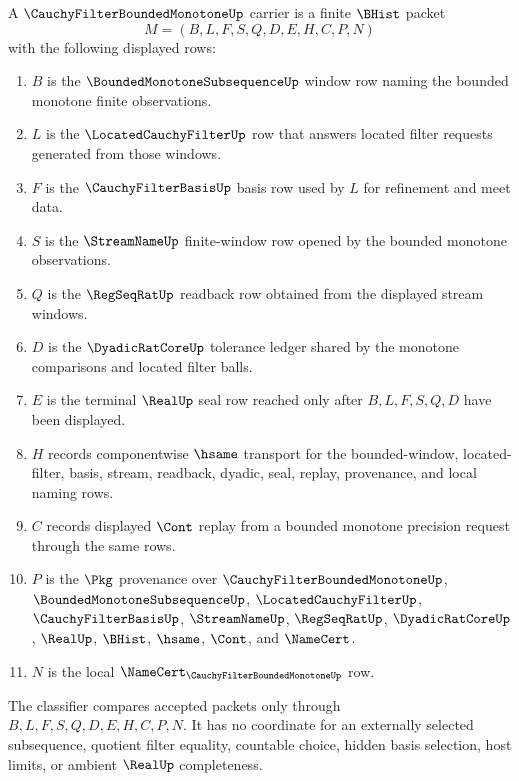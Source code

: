 \begin{definition}
\label{def:cauchy-filter-bounded-monotone-carrier}
A $\CauchyFilterBoundedMonotoneUp$ carrier is a finite $\BHist$ packet
$$
M=(B,L,F,S,Q,D,E,H,C,P,N)
$$
with the following displayed rows:
\begin{enumerate}
\item $B$ is the $\BoundedMonotoneSubsequenceUp$ window row naming the bounded monotone finite observations.
\item $L$ is the $\LocatedCauchyFilterUp$ row that answers located filter requests generated from those windows.
\item $F$ is the $\CauchyFilterBasisUp$ basis row used by $L$ for refinement and meet data.
\item $S$ is the $\StreamNameUp$ finite-window row opened by the bounded monotone observations.
\item $Q$ is the $\RegSeqRatUp$ readback row obtained from the displayed stream windows.
\item $D$ is the $\DyadicRatCoreUp$ tolerance ledger shared by the monotone comparisons and located filter balls.
\item $E$ is the terminal $\RealUp$ seal row reached only after $B,L,F,S,Q,D$ have been displayed.
\item $H$ records componentwise $\hsame$ transport for the bounded-window, located-filter, basis, stream, readback, dyadic, seal, replay, provenance, and local naming rows.
\item $C$ records displayed $\Cont$ replay from a bounded monotone precision request through the same rows.
\item $P$ is the $\Pkg$ provenance over $\CauchyFilterBoundedMonotoneUp$, $\BoundedMonotoneSubsequenceUp$, $\LocatedCauchyFilterUp$, $\CauchyFilterBasisUp$, $\StreamNameUp$, $\RegSeqRatUp$, $\DyadicRatCoreUp$, $\RealUp$, $\BHist$, $\hsame$, $\Cont$, and $\NameCert$.
\item $N$ is the local $\NameCert_{\CauchyFilterBoundedMonotoneUp}$ row.
\end{enumerate}
The classifier compares accepted packets only through $B,L,F,S,Q,D,E,H,C,P,N$. It has no coordinate for an externally selected subsequence, quotient filter equality, countable choice, hidden basis selection, host limits, or ambient $\RealUp$ completeness.
\end{definition}

